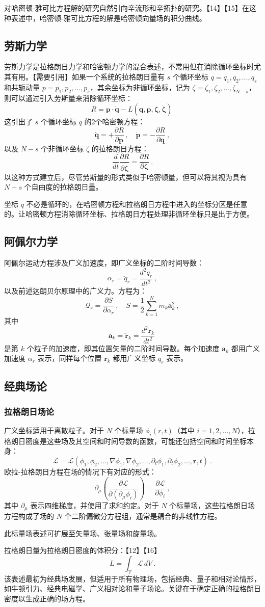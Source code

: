 对哈密顿-雅可比方程解的研究自然引向辛流形和辛拓扑的研究。【14】【15】在这种表述中，哈密顿-雅可比方程的解是哈密顿向量场的积分曲线。
\subsection{劳斯力学}  
劳斯力学是拉格朗日力学和哈密顿力学的混合表述，不常用但在消除循环坐标时尤其有用。【需要引用】如果一个系统的拉格朗日量有 \( s \) 个循环坐标 \( q = q_1, q_2, \dots, q_s \) 和共轭动量 \( p = p_1, p_2, \dots, p_s \)，其余坐标为非循环坐标，记为 \( \zeta = \zeta_1, \zeta_2, \dots, \zeta_{N - s} \)，则可以通过引入劳斯量来消除循环坐标：
\[
R = \mathbf{p} \cdot \mathbf{\dot{q}} - L(\mathbf{q}, \mathbf{p}, \boldsymbol{\zeta}, \dot{\boldsymbol{\zeta}})~
\]
这引出了 \( s \) 个循环坐标 \( q \) 的2个哈密顿方程：
\[
\dot{\mathbf{q}} = +\frac{\partial R}{\partial \mathbf{p}} \,, \quad \dot{\mathbf{p}} = -\frac{\partial R}{\partial \mathbf{q}} ~,
\]
以及 \( N - s \) 个非循环坐标 \( \zeta \) 的拉格朗日方程：
\[
\frac{d}{dt} \frac{\partial R}{\partial \dot{\boldsymbol{\zeta}}} = \frac{\partial R}{\partial \boldsymbol{\zeta}} ~.
\]
以这种方式建立后，尽管劳斯量的形式类似于哈密顿量，但可以将其视为具有 \( N - s \) 个自由度的拉格朗日量。

坐标 \( q \) 不必是循环的，在哈密顿方程和拉格朗日方程中进入的坐标分区是任意的。让哈密顿方程消除循环坐标、拉格朗日方程处理非循环坐标只是出于方便。
\subsection{阿佩尔力学}   
阿佩尔运动方程涉及广义加速度，即广义坐标的二阶时间导数：
\[
\alpha_r = \ddot{q}_r = \frac{d^2 q_r}{dt^2} ~,
\]
以及前述达朗贝尔原理中的广义力。方程为：
\[
\mathcal{Q}_r = \frac{\partial S}{\partial \alpha_r} \,, \quad S = \frac{1}{2} \sum_{k=1}^{N} m_k \mathbf{a}_k^2 ~,
\]
其中
\[
\mathbf{a}_k = \ddot{\mathbf{r}}_k = \frac{d^2 \mathbf{r}_k}{dt^2}~
\]
是第 \( k \) 个粒子的加速度，即其位置矢量的二阶时间导数。每个加速度 \( \mathbf{a}_k \) 都用广义加速度 \( \alpha_r \) 表示，同样每个位置 \( \mathbf{r}_k \) 都用广义坐标 \( q_r \) 表示。
\subsection{经典场论}  
\subsubsection{拉格朗日场论}  
广义坐标适用于离散粒子。对于 \( N \) 个标量场 \( \phi_i(r, t) \)（其中 \( i = 1, 2, \dots, N \)），拉格朗日密度是这些场及其空间和时间导数的函数，可能还包括空间和时间坐标本身：
\[
\mathcal{L} = \mathcal{L}(\phi_1, \phi_2, \dots, \nabla \phi_1, \nabla \phi_2, \dots, \partial_t \phi_1, \partial_t \phi_2, \dots, \mathbf{r}, t) ~.
\]
欧拉-拉格朗日方程在场的情况下有对应的形式：
\[
\partial_\mu \left( \frac{\partial \mathcal{L}}{\partial (\partial_\mu \phi_i)} \right) = \frac{\partial \mathcal{L}}{\partial \phi_i} ~,
\]
其中 \( \partial_\mu \) 表示四维梯度，并使用了求和约定。对于 \( N \) 个标量场，这些拉格朗日场方程构成了场的 \( N \) 个二阶偏微分方程组，通常是耦合的非线性方程。

此标量场表述可扩展至矢量场、张量场和旋量场。

拉格朗日量为拉格朗日密度的体积分：【12】【16】
\[
L = \int_{\mathcal{V}} \mathcal{L} \, dV ~.
\]
该表述最初为经典场发展，但适用于所有物理场，包括经典、量子和相对论情形，如牛顿引力、经典电磁学、广义相对论和量子场论。关键在于确定正确的拉格朗日密度以生成正确的场方程。